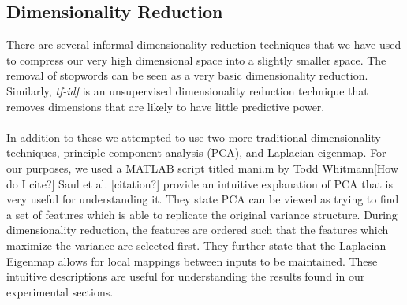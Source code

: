\subsection{Dimensionality Reduction}
There are several informal dimensionality reduction techniques that we have used to compress our very high dimensional space into a slightly smaller space. The removal of stopwords can be seen as a very basic dimensionality reduction. Similarly, \emph{tf-idf} is an unsupervised dimensionality reduction technique that removes dimensions that are likely to have little predictive power.  
\\
\\In addition to these we attempted to use two more traditional dimensionality techniques, principle component analysis (PCA), and Laplacian eigenmap.  For our purposes, we used a MATLAB script titled mani.m by Todd Whitmann[How do I cite?]   Saul et al. [citation?] provide an intuitive explanation of PCA that is very useful for understanding it.  They state PCA can be viewed as trying to find a set of features which is able to replicate the original variance structure.  During dimensionality reduction, the features are ordered such that the features which maximize the variance are selected first.  They further state that the Laplacian Eigenmap allows for local mappings between inputs to be maintained.  These intuitive descriptions are useful for understanding the results found in our experimental sections.





